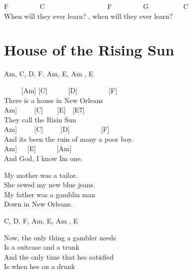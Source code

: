 \documentclass[
  letterpaper,
]{scrbook}
\begin{document}
F~~~~~~~~~C~~~~~~~~~~~~~~~~~~F~~~~~~~~~G~~~~~~~~~~C\\
When will they ever learn? , when will they ever learn?

\hypertarget{house-of-the-rising-sun}{%
\chapter{House of the Rising Sun}\label{house-of-the-rising-sun}}

Am, C, D, F, Am, E, Am , E

~~~~~{[}Am{]} {[}C{]}~~~~~~{[}D{]}~~~~~~~~~{[}F{]}\\
There is a house in New Orleans\\
\hspace*{0.333em}\hspace*{0.333em}\hspace*{0.333em}\hspace*{0.333em}{[}Am{]}~~~~~{[}C{]}~~~~{[}E{]}~~{[}E7{]}\\
They call the Risin\textquotesingle{} Sun\\
\hspace*{0.333em}\hspace*{0.333em}\hspace*{0.333em}\hspace*{0.333em}\hspace*{0.333em}\hspace*{0.333em}\hspace*{0.333em}\hspace*{0.333em}{[}Am{]}~~~~~{[}C{]}~~~~~{[}D{]}~~~~~~~~~{[}F{]}\\
And it\textquotesingle s been the ruin of many a poor boy.\\
\hspace*{0.333em}\hspace*{0.333em}\hspace*{0.333em}{[}Am{]}~~~{[}E{]}~~~~~~{[}Am{]}\\
And God, I know I\textquotesingle m one.

My mother was a tailor.\\
She sewed my new blue jeans.\\
My father was a gamblin\textquotesingle{} man\\
Down in New Orleans.

C, D, F, Am, E, Am , E

Now, the only thing a gambler needs\\
Is a suitcase and a trunk\\
And the only time that he\textquotesingle s satisfied\\
Is when he\textquotesingle s on a drunk
\end{document}
